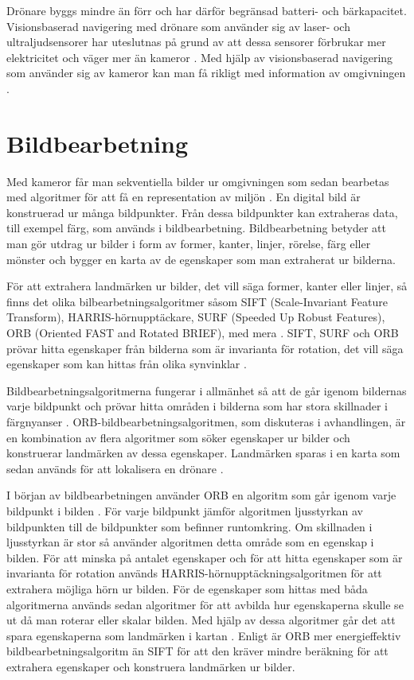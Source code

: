 Drönare byggs mindre än förr och har därför begränsad batteri- och bärkapacitet. Visionsbaserad navigering med drönare som använder sig av laser- och ultraljudsensorer har uteslutnas på grund av att dessa sensorer förbrukar mer elektricitet och väger mer än kameror \citep{6385934}. Med hjälp av visionsbaserad navigering som använder sig av kameror kan man få rikligt med information av omgivningen \citep{geospatial}.

\section{Bildbearbetning}

Med kameror får man sekventiella bilder ur omgivningen som sedan bearbetas med algoritmer för att få en representation av miljön \citep{982903}. En digital bild är konstruerad ur många bildpunkter. Från dessa bildpunkter kan extraheras data, till exempel färg, som används i bildbearbetning. Bildbearbetning betyder att man gör utdrag ur bilder i form av former, kanter, linjer, rörelse, färg eller mönster och bygger en karta av de egenskaper som man extraherat ur bilderna. 

För att extrahera landmärken ur bilder, det vill säga former, kanter eller linjer, så finns det olika bilbearbetningsalgoritmer såsom SIFT (Scale-Invariant Feature Transform), HARRIS-hörnupptäckare, SURF (Speeded Up Robust Features), ORB (Oriented FAST and Rotated BRIEF), med mera \citep{orb, slamproblem, mapbuildingsift}. SIFT, SURF och ORB prövar hitta egenskaper från bilderna som är invarianta för rotation, det vill säga egenskaper som kan hittas från olika synvinklar \citep{orb}. 

Bildbearbetningsalgoritmerna fungerar i allmänhet så att de går igenom bildernas varje bildpunkt och prövar hitta områden i bilderna som har stora skillnader i färgnyanser \citep{orb}. ORB-bildbearbetningsalgoritmen, som diskuteras i avhandlingen, är en kombination av flera algoritmer som söker egenskaper ur bilder och konstruerar landmärken av dessa egenskaper. Landmärken sparas i en karta som sedan används för att lokalisera en drönare \citep{geospatial}.

I början av bildbearbetningen använder ORB en algoritm som går igenom varje bildpunkt i bilden \citep{orb}. För varje bildpunkt jämför algoritmen ljusstyrkan av bildpunkten till de bildpunkter som befinner runtomkring. Om skillnaden i ljusstyrkan är stor så använder algoritmen detta område som en egenskap i bilden. För att minska på antalet egenskaper och för att hitta egenskaper som är invarianta för rotation används HARRIS-hörnupptäckningsalgoritmen för att extrahera möjliga hörn ur bilden. För de egenskaper som hittas med båda algoritmerna används sedan algoritmer för att avbilda hur egenskaperna skulle se ut då man roterar eller skalar bilden. Med hjälp av dessa algoritmer går det att spara egenskaperna som landmärken i kartan \citep{orb}. Enligt \cite{orb} är ORB mer energieffektiv bildbearbetningsalgoritm än SIFT för att den kräver mindre beräkning för att extrahera egenskaper och konstruera landmärken ur bilder.

